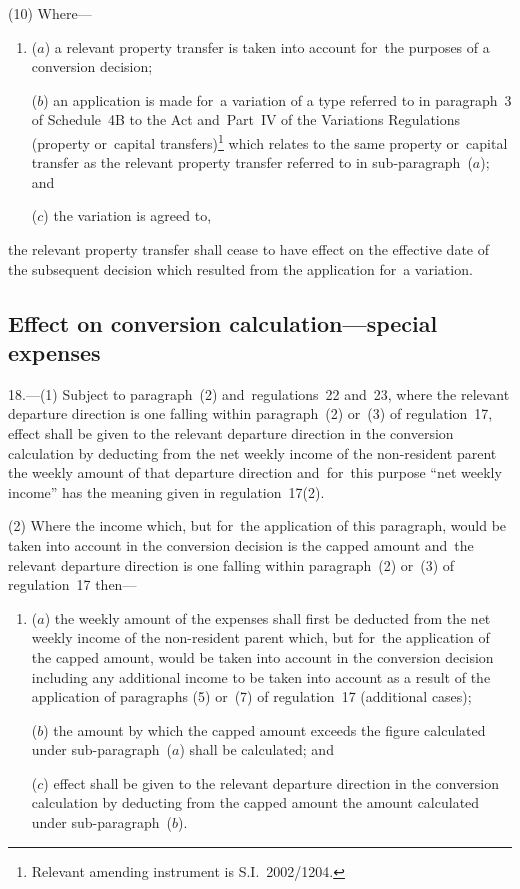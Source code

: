 \documentclass[12pt,a4paper]{article}
\begin{document}
(10) Where—
\begin{enumerate}\item[]
($a$) a relevant property transfer is taken into account for~the purposes of a conversion decision;

($b$) an application is made for~a variation of a type referred to in paragraph~3 of Schedule~4B to the Act and~Part~IV of the Variations Regulations (property or~capital transfers)\footnote{Relevant amending instrument is S.I.~2002/1204.} which relates to the same property or~capital transfer as the relevant property transfer referred to in sub-paragraph~($a$); and

($c$) the variation is agreed to,
\end{enumerate}
the relevant property transfer shall cease to have effect on the effective date of the subsequent decision which resulted from the application for~a variation.


\subsection[18. Effect on conversion calculation—special expenses]{Effect on conversion calculation—special expenses}

18.---(1)  Subject to paragraph~(2) and~regulations~22 and~23, where the relevant departure direction is one falling within paragraph~(2) or~(3) of regulation~17, effect shall be given to the relevant departure direction in the conversion calculation by deducting from the net weekly income of the non-resident parent the weekly amount of that departure direction and~for~this purpose “net weekly income” has the meaning given in regulation~17(2).

(2) Where the income which, but for~the application of this paragraph, would be taken into account in the conversion decision is the capped amount and~the relevant departure direction is one falling within paragraph~(2) or~(3) of regulation~17 then—
\begin{enumerate}\item[]
($a$) the weekly amount of the expenses shall first be deducted from the net weekly income of the non-resident parent which, but for~the application of the capped amount, would be taken into account in the conversion decision including any additional income to be taken into account as a result of the application of paragraphs (5) or~(7) of regulation~17 (additional cases);

($b$) the amount by which the capped amount exceeds the figure calculated under sub-paragraph~($a$)  shall be calculated; and

($c$) effect shall be given to the relevant departure direction in the conversion calculation by deducting from the capped amount the amount calculated under sub-paragraph~($b$).
\end{enumerate}
\end{document}
